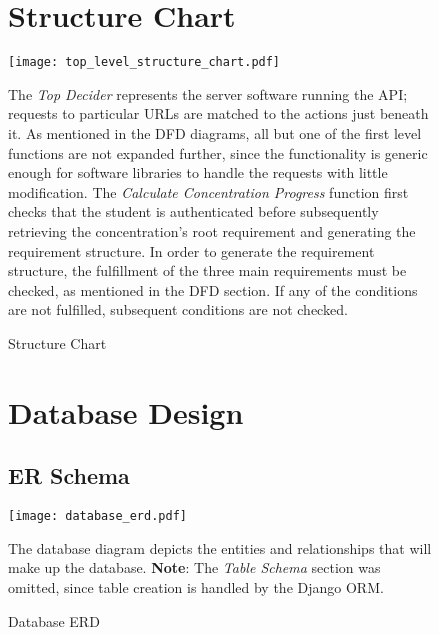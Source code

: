 \documentclass[12pt]{article}
\begin{document}
\begin{figure}[p!]
  \section{Structure Chart}
  \centering
  \texttt{[image: top\_level\_structure\_chart.pdf]}
  \caption{Structure Chart}
  \begin{flushleft}
    The \emph{Top Decider} represents the server software running the API; requests to particular
    URLs are matched to the actions just beneath it. As mentioned in the DFD diagrams, all but one
    of the first level functions are not expanded further, since the functionality is generic enough
    for software libraries to handle the requests with little modification. The \emph{Calculate
    Concentration Progress} function first checks that the student is authenticated before
    subsequently retrieving the concentration's root requirement and generating the requirement
    structure. In order to generate the requirement structure, the fulfillment of the three main
    requirements must be checked, as mentioned in the DFD section. If any of the conditions are not
    fulfilled, subsequent conditions are not checked.
  \end{flushleft}
\end{figure}


\begin{figure}[p!]
  \section{Database Design}
  \subsection{ER Schema}
  \centering
  \texttt{[image: database\_erd.pdf]}
  \caption{Database ERD}
  \begin{flushleft}
    The database diagram depicts the entities and relationships that will make up the database.
    \textbf{Note}: The \emph{Table Schema} section was omitted, since table creation is handled by
    the Django ORM.
  \end{flushleft}
\end{figure}

\clearpage
\end{document}
